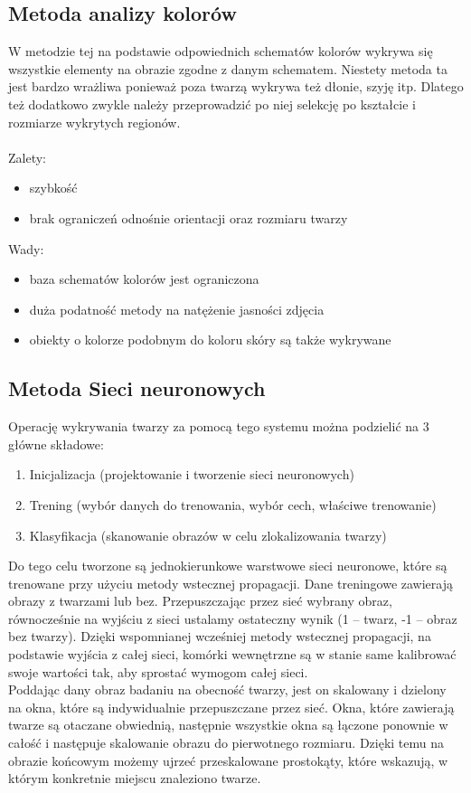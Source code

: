 \documentclass[11pt,a4paper]{article}
\begin{document}
\subsection{Metoda analizy kolorów}
W metodzie tej na podstawie odpowiednich schematów kolorów wykrywa się wszystkie elementy na obrazie zgodne z danym schematem. Niestety metoda ta jest bardzo wrażliwa ponieważ poza twarzą wykrywa też dłonie, szyję itp. Dlatego też dodatkowo zwykle należy przeprowadzić po niej selekcję po kształcie i rozmiarze wykrytych regionów. 
\\
\\
\noindent Zalety:
\begin{itemize}
\item szybkość
\item brak ograniczeń odnośnie orientacji oraz rozmiaru twarzy
\end{itemize}

\noindent Wady:
\begin{itemize}
\item baza schematów kolorów jest ograniczona
\item duża podatność metody na natężenie jasności zdjęcia
\item obiekty o kolorze podobnym do koloru skóry są także wykrywane
\end{itemize}

\subsection{Metoda Sieci neuronowych}
Operację wykrywania twarzy za pomocą tego systemu można podzielić na 3 główne składowe:
\begin{enumerate}
\item Inicjalizacja (projektowanie i tworzenie sieci neuronowych)
\item Trening (wybór danych do trenowania, wybór cech, właściwe trenowanie)
\item Klasyfikacja (skanowanie obrazów w celu zlokalizowania twarzy)
\end{enumerate}

\noindent 
Do tego celu tworzone są jednokierunkowe warstwowe sieci neuronowe, które są trenowane przy użyciu metody wstecznej propagacji. Dane treningowe zawierają obrazy z twarzami lub bez. Przepuszczając przez sieć wybrany obraz, równocześnie na wyjściu z sieci ustalamy ostateczny wynik (1 – twarz, -1 – obraz bez twarzy).  Dzięki wspomnianej wcześniej metody wstecznej propagacji, na podstawie wyjścia z całej sieci, komórki wewnętrzne są w stanie same kalibrować swoje wartości tak, aby sprostać wymogom całej sieci.\\
Poddając dany obraz badaniu na obecność twarzy, jest on skalowany i dzielony na okna, które są indywidualnie przepuszczane przez sieć. Okna, które zawierają twarze są otaczane obwiednią, następnie wszystkie okna są łączone ponownie w całość i następuje skalowanie obrazu do pierwotnego rozmiaru. Dzięki temu na obrazie końcowym możemy ujrzeć przeskalowane prostokąty, które wskazują, w którym konkretnie miejscu znaleziono twarze.
\end{document}
